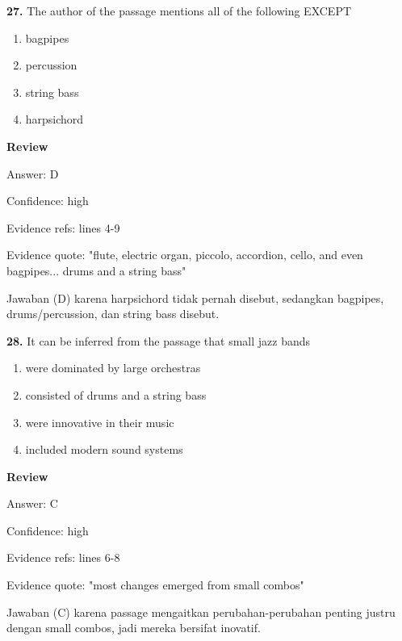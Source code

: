 \documentclass[12pt]{article}
\begin{document}
\endgroup
\par
\vspace{0.25\baselineskip}
\noindent\textbf{27.} The author of the passage mentions all of the following EXCEPT
\begin{enumerate}[label=(\Alph*),leftmargin=*,itemsep=0.2em]
\item bagpipes
\item percussion
\item string bass
\item harpsichord
\end{enumerate}
\par
\begingroup
\setlength{\parskip}{0pt}
\setlength{\parindent}{0pt}
\textbf{Review}\par
Answer: D\par
Confidence: high\par
Evidence refs: lines 4-9\par
Evidence quote: "flute, electric organ, piccolo, accordion, cello, and even bagpipes... drums and a string bass"\par
Jawaban (D) karena harpsichord tidak pernah disebut, sedangkan bagpipes, drums/percussion, dan string bass disebut.\par
\endgroup
\par
\vspace{0.25\baselineskip}
\noindent\textbf{28.} It can be inferred from the passage that small jazz bands
\begin{enumerate}[label=(\Alph*),leftmargin=*,itemsep=0.2em]
\item were dominated by large orchestras
\item consisted of drums and a string bass
\item were innovative in their music
\item included modern sound systems
\end{enumerate}
\par
\begingroup
\setlength{\parskip}{0pt}
\setlength{\parindent}{0pt}
\textbf{Review}\par
Answer: C\par
Confidence: high\par
Evidence refs: lines 6-8\par
Evidence quote: "most changes emerged from small combos"\par
Jawaban (C) karena passage mengaitkan perubahan-perubahan penting justru dengan small combos, jadi mereka bersifat inovatif.\par
\endgroup
\par
\end{document}
